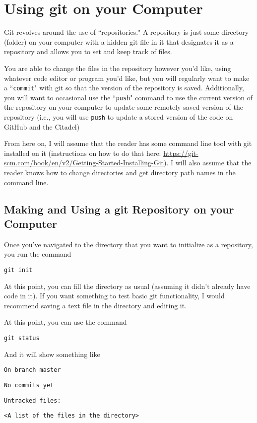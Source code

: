 \documentclass[11pt]{article}
\begin{document}
\section{Using git on your Computer}

Git revolves around the use of ``repositories."  A repository is just some directory (folder) on your computer with a hidden git file in it that designates it as a repository and allows you to set and keep track of files.

You are able to change the files in the repository however you'd like, using whatever code editor or program you'd like, but you will regularly want to make a ``\texttt{commit}" with git so that the version of the repository is saved.  Additionally, you will want to occasional use the ``\texttt{push}" command to use the current version of the repository on your computer to update some remotely saved version of the repository (i.e., you will use \texttt{push} to update a stored version of the code on GitHub and the Citadel)

From here on, I will assume that the reader has some command line tool with git installed on it (instructions on how to do that here: \url{https://git-scm.com/book/en/v2/Getting-Started-Installing-Git}).  I will also assume that the reader knows how to change directories and get directory path names in the command line.

\subsection{Making and Using a git Repository on your Computer}

Once you've navigated to the directory that you want to initialize as a repository, you run the command

\quad \texttt{git init}

At this point, you can fill the directory as usual (assuming it didn't already have code in it).  If you want something to test basic git functionality, I would recommend saving a text file in the directory and editing it.

At this point, you can use the command

\quad \texttt{git status}

And it will show something like

\texttt{On branch master}

\texttt{No commits yet}

\texttt{Untracked files:}

\quad \texttt{<A list of the files in the directory>}
\end{document}
